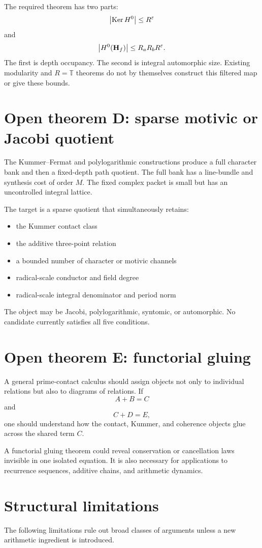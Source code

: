 The required theorem has two parts:
\[
\left|\operatorname{Ker} H^0\right|\le R^\varepsilon
\]
and
\[
\left|H^0(\mathbf H_f)\right|\le R_aR_bR^\varepsilon.
\]
The first is depth occupancy. The second is integral automorphic size. Existing modularity and $R=\mathbb T$ theorems do not by themselves construct this filtered map or give these bounds.

\section{Open theorem D: sparse motivic or Jacobi quotient}
The Kummer--Fermat and polylogarithmic constructions produce a full character bank and then a fixed-depth path quotient. The full bank has a line-bundle and synthesis cost of order $M$. The fixed complex packet is small but has an uncontrolled integral lattice.

The target is a sparse quotient that simultaneously retains:
\begin{itemize}[leftmargin=1.5em]
\item the Kummer contact class
\item the additive three-point relation
\item a bounded number of character or motivic channels
\item radical-scale conductor and field degree
\item radical-scale integral denominator and period norm
\end{itemize}

The object may be Jacobi, polylogarithmic, syntomic, or automorphic. No candidate currently satisfies all five conditions.

\section{Open theorem E: functorial gluing}
A general prime-contact calculus should assign objects not only to individual relations but also to diagrams of relations. If
\[
A+B=C
\]
and
\[
C+D=E,
\]
one should understand how the contact, Kummer, and coherence objects glue across the shared term $C$.

A functorial gluing theorem could reveal conservation or cancellation laws invisible in one isolated equation. It is also necessary for applications to recurrence sequences, additive chains, and arithmetic dynamics.

\section{Structural limitations}
The following limitations rule out broad classes of arguments unless a new arithmetic ingredient is introduced.

